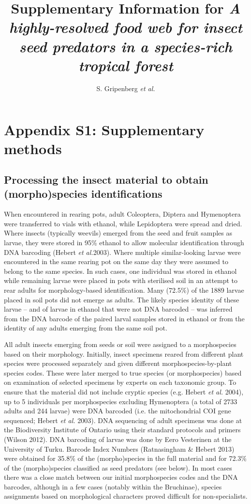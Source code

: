 \documentclass[11pt]{article}
\title{Supplementary Information for \emph{A highly-resolved food web for insect seed predators in a species-rich tropical forest}}
\author{S. Gripenberg \emph{et al.}}
\date{}
\begin{document}
\maketitle


\tableofcontents


\newpage

\section{Appendix S1: Supplementary methods}

\subsection*{Processing the insect material to obtain (morpho)species identifications}

When encountered in rearing pots, adult Coleoptera, Diptera and Hymenoptera were transferred to vials with ethanol, while Lepidoptera were spread and dried. Where insects (typically weevils) emerged from the seed and fruit samples as larvae, they were stored in 95\% ethanol to allow molecular identification through DNA barcoding (Hebert \emph{et al.}2003). Where multiple similar-looking larvae were encountered in the same rearing pot on the same day they were assumed to belong to the same species. In such cases, one individual was stored in ethanol while remaining larvae were placed in pots with sterilised soil in an attempt to rear adults for morphology-based identification. Many (72.5\%) of the 1889 larvae placed in soil pots did not emerge as adults. The likely species identity of these larvae – and of larvae in ethanol that were not DNA barcoded – was inferred from the DNA barcode of the paired larval samples stored in ethanol or from the identity of any adults emerging from the same soil pot. 

All adult insects emerging from seeds or soil were assigned to a morphospecies based on their morphology. Initially, insect specimens reared from different plant species were processed separately and given different morphospecies-by-plant species codes. These were later merged to true species (or morphospecies) based on examination of selected specimens by experts on each taxonomic group. To ensure that the material did not include cryptic species (e.g. Hebert \emph{et al. }2004), up to 5 individuals per morphospecies excluding Hymenoptera (a total of 2733 adults and 244 larvae) were DNA barcoded (i.e. the mitochondrial COI gene sequenced; Hebert \emph{et al. }2003). DNA sequencing of adult specimens was done at the Biodiversity Institute of Ontario using their standard protocols and primers (Wilson 2012). DNA barcoding of larvae was done by Eero Vesterinen at the University of Turku. Barcode Index Numbers (Ratnasingham \& Hebert 2013) were obtained for 35.8\% of the (morpho)species in the full material and for 72.3\% of the (morpho)species classified as seed predators (see below). In most cases there was a close match between our initial morphospecies codes and the DNA barcodes, although in a few cases (notably within the Bruchinae), species assignments based on morphological characters proved difficult for non-specialists.
\end{document}
